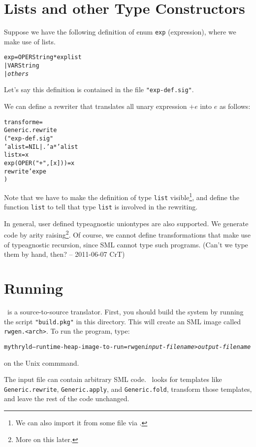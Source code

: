 \section{Lists and other Type Constructors}

Suppose we have the following definition of enum
\verb|exp| (expression), where we make use of lists.
\begin{alltt}
  \UNIONTYPE exp = OPER \OF String * exp list
                | VAR \OF String
                | {\em others}
\end{alltt}
Let's say this definition is contained in the file \verb|"exp-def.sig"|.

We can define a rewriter that translates all unary expression $+e$ 
into $e$ as follows:
\begin{alltt}
   \FUN transform e =
   Generic.rewrite
   ( \LET \INCLUDE "exp-def.sig"
          \UNIONTYPE 'a list = NIL | . \OF 'a * 'a list 
          \FUN list x = x
          \FUN exp (OPER("+",[x])) = x
     \IN  rewrite'exp e
     \END
   )
\end{alltt}
 Note that we have to make the definition of
type \verb|list| visible\footnote{We can also import it from some file
via \INCLUDE.}, and define the function \verb|list| to tell \RewriteGen{}
that type \verb|list| is involved in the rewriting. 

 In general, user defined typeagnostic uniontypes are also supported.
We generate code by arity raising\footnote{More on this later.}.
 Of course, we cannot define transformations that make use of 
typeagnostic recursion, since SML cannot type such programs.
(Can't we type them by hand, then? -- 2011-06-07 CrT)

\section{Running \RewriteGen}

  \RewriteGen\ is a source-to-source translator.  First, you should
build the system by running the script \verb|"build.pkg"| in this
directory.  This will create an SML image called \verb|rwgen.<arch>|.
To run the program, type:
\begin{alltt}
    mythryld --runtime-heap-image-to-run=rwgen {\em input-filename} > {\em output-filename}
\end{alltt}
\noindent on the Unix commmand.

The input file can contain arbitrary SML code.  \RewriteGen\ looks
for templates like \verb|Generic.rewrite|, \verb|Generic.apply|,
and \verb|Generic.fold|, transform those templates, and
leave the rest of the code unchanged.


